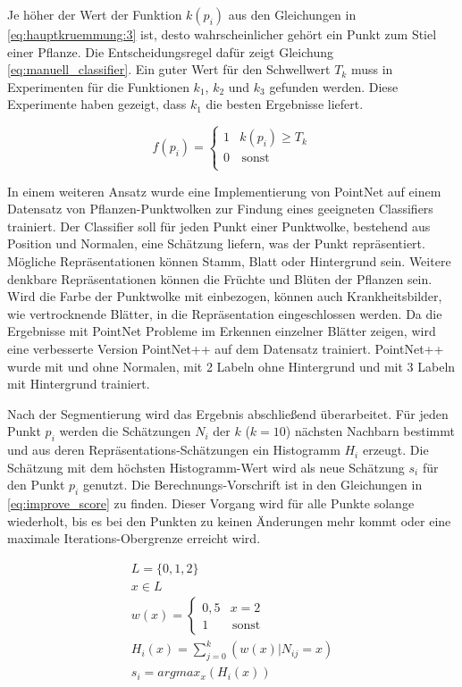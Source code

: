 \documentclass[12pt,titlepage, twoside]{article}
\begin{document}
Je höher der Wert der Funktion $k(p_i)$ aus den Gleichungen in \ref{eq:hauptkruemmung:3} ist, desto wahrscheinlicher gehört ein Punkt zum Stiel einer Pflanze. 
Die Entscheidungsregel dafür zeigt Gleichung \ref{eq:manuell_classifier}.
Ein guter Wert für den Schwellwert $T_k$ muss in Experimenten für die Funktionen $k_1$, $k_2$ und $k_3$ gefunden werden. 
Diese Experimente haben gezeigt, dass $k_1$ die besten Ergebnisse liefert.

\begin{equation}
\label{eq:manuell_classifier}
f(p_i) = \left\{
\begin{array}{ll}
1 & k(p_i) \geq T_k \\
0 & \, \textrm{sonst} \\
\end{array}
\right. 
\end{equation}

In einem weiteren Ansatz wurde eine Implementierung von PointNet auf einem Datensatz von Pflanzen-Punktwolken zur Findung eines geeigneten Classifiers trainiert.
Der Classifier soll für jeden Punkt einer Punktwolke, bestehend aus Position und Normalen, eine Schätzung liefern, was der Punkt repräsentiert. 
Mögliche Repräsentationen können Stamm, Blatt oder Hintergrund sein.
Weitere denkbare Repräsentationen können die Früchte und Blüten der Pflanzen sein. 
Wird die Farbe der Punktwolke mit einbezogen, können auch Krankheitsbilder, wie vertrocknende Blätter, in die Repräsentation eingeschlossen werden.  
Da die Ergebnisse mit PointNet Probleme im Erkennen einzelner Blätter zeigen, wird eine verbesserte Version PointNet++ auf dem Datensatz trainiert. 
PointNet++ wurde mit und ohne Normalen, mit 2 Labeln ohne Hintergrund und mit 3 Labeln mit Hintergrund trainiert.

Nach der Segmentierung wird das Ergebnis abschließend überarbeitet. 
Für jeden Punkt $p_i$ werden die Schätzungen $N_i$ der $k$ ($k=10$) nächsten Nachbarn bestimmt und aus deren Repräsentations-Schätzungen ein Histogramm $H_i$ erzeugt.
Die Schätzung mit dem höchsten Histogramm-Wert wird als neue Schätzung $s_i$ für den Punkt $p_i$ genutzt. Die Berechnungs-Vorschrift ist in den Gleichungen in \ref{eq:improve_score} zu finden. 
Dieser Vorgang wird für alle Punkte solange wiederholt, bis es bei den Punkten zu keinen Änderungen mehr kommt oder eine maximale Iterations-Obergrenze erreicht wird.

\begin{equation}
\label{eq:improve_score}
\begin{array}{l}
L =  \{0,1,2\}\\
x \in L\\
w(x) = \left\{
\begin{array}{ll}
0,5 & x = 2 \\
1 & \, \textrm{sonst} 
\end{array}
\right.\\ 
H_i(x) = \sum_{j=0}^{k}{(w(x) | N_{ij} = x)}\\
s_i = argmax_x(H_i(x))
\end{array}
\end{equation}
\end{document}
